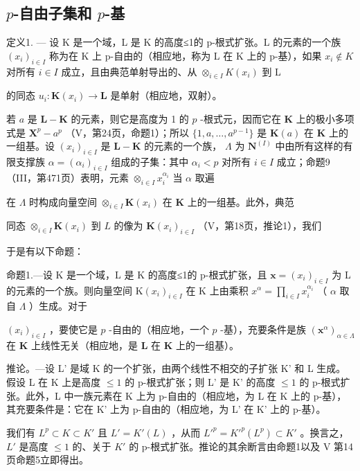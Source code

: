 \subsection{\texorpdfstring{\(p\)-自由子集和 \(p\)-基}{p-自由子集和 p-基}}

定义1. --- 设 K 是一个域，L 是 K 的高度≤1的 p-根式扩张。L 的元素的一个族 \((x_i)_{i \in I}\) 称为在 K 上 p-自由的（相应地，称为 L 在 K 上的 p-基），如果 \(x_i \notin K\) 对所有 \(i \in I\) 成立，且由典范单射导出的、从 \(\otimes_{i \in I} K(x_i)\) 到 L

的同态 \(u_{i}:\mathbf{K}(x_{i})\to \mathbf{L}\) 是单射（相应地，双射）。

若 \(a\) 是 \(\mathbf{L} - \mathbf{K}\) 的元素，则它是高度为 1 的 \(p\) -根式元，因而它在 \(\mathbf{K}\) 上的极小多项式是 \(\mathbf{X}^p - a^p\) （V，第24页，命题1）；所以 \(\{1, a, \ldots, a^{p-1}\}\) 是 \(\mathbf{K}(a)\) 在 \(\mathbf{K}\) 上的一组基。设 \((x_i)_{i \in I}\) 是 \(\mathbf{L} - \mathbf{K}\) 的元素的一个族， \(\Lambda\) 为 \(\mathbf{N}^{(I)}\) 中由所有这样的有限支撑族 \(\alpha = (\alpha_i)_{i \in I}\) 组成的子集：其中 \(\alpha_i < p\) 对所有 \(i \in I\) 成立；命题9（III，第471页）表明，元素 \(\otimes_{i \in I} x_i^{\alpha_i}\) 当 \(\alpha\) 取遍

在 \(\Lambda\) 时构成向量空间 \(\otimes_{i\in I}\mathbf{K}(x_i)\) 在 \(\mathbf{K}\) 上的一组基。此外，典范

同态 \(\otimes_{i\in I}\mathbf{K}(x_i)\) 到 \(L\) 的像为 \(\mathbf{K}(x_i)_{i\in I}\) （V，第18页，推论1），我们

于是有以下命题：

命题1.---设 K 是一个域，L 是 K 的高度≤1的 p-根式扩张，且 \(\mathbf{x} = (x_{i})_{i \in I}\) 为 L 的元素的一个族。则向量空间 \(\mathrm{K}(x_{i})_{i \in I}\) 在 K 上由乘积 \(x^{\alpha} = \prod_{i \in I} x_{i}^{\alpha_{i}}\) （ \(\alpha\) 取自 \(\Lambda\) ）生成。对于

\((x_{i})_{i\in I}\) ，要使它是 \(p\) -自由的（相应地，一个 \(p\) -基），充要条件是族 \((\mathbf{x}^{\alpha})_{\alpha \in \Lambda}\) 在 \(\mathbf{K}\) 上线性无关（相应地，是 \(\mathbf{L}\) 在 \(\mathbf{K}\) 上的一组基）。

推论。---设 L' 是域 K 的一个扩张，由两个线性不相交的子扩张 K' 和 L 生成。假设 L 在 K 上是高度 \(\leqslant 1\) 的 p-根式扩张；则 L' 是 K' 的高度 \(\leqslant 1\) 的 p-根式扩张。此外，L 中一族元素在 K 上为 p-自由的（相应地，为 L 在 K 上的 p-基），其充要条件是：它在 K' 上为 p-自由的（相应地，为 L' 在 K' 上的 p-基）。

我们有 \(L^{p} \subset K \subset K'\) 且 \(L' = K'(L)\) ，从而 \(L'^{p} = K'^{p}(L^{p}) \subset K'\) 。换言之， \(L'\) 是高度 \(\leqslant 1\) 的、关于 \(K'\) 的 p-根式扩张。推论的其余断言由命题1以及 V 第14页命题5立即得出。

